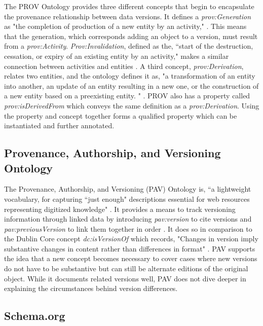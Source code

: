 The PROV Ontology provides three different concepts that begin to encapsulate the provenance relationship between data versions.
It defines a \textit{prov:Generation} as "the completion of production of a new entity by an activity," \cite{Lebo2013}.
This means that the generation, which corresponds adding an object to a version, must result from a \textit{prov:Activity}.
\textit{Prov:Invalidation}, defined as the, ``start of the destruction, cessation, or expiry of an existing entity by an activity," makes a similar connection between activities and entities \cite{Lebo2013}.
A third concept, \textit{prov:Derivation}, relates two entities, and the ontology defines it as, "a transformation of an entity into another, an update of an entity resulting in a new one, or the construction of a new entity based on a preexisting entity. " \cite{Lebo2013}.
PROV also has a property called \textit{prov:isDerivedFrom} which conveys the same definition as a \textit{prov:Derivation}.
Using the property and concept together forms a qualified property which can be instantiated and further annotated.

\subsection{Provenance, Authorship, and Versioning Ontology}

The Provenance, Authorship, and Versioning (PAV) Ontology is, ``a lightwei\-ght vocabulary, for capturing ``just enough" descriptions essential for web resources representing digitized knowledge" \cite{Ciccarese2013}.
It provides a means to track versioning information through linked data by introducing \textit{pav:version} to cite versions and \textit{pav:previousVersion} to link them together in order \cite{Ciccarese2013}.
It does so in comparison to the Dublin Core concept \textit{dc:isVersionOf} which records, "Changes in version imply substantive changes in content rather than differences in format" \cite{DCMI2012}.
PAV supports the idea that a new concept becomes necessary to cover cases where new versions do not have to be substantive but can still be alternate editions of the original object.
While it documents related versions well, PAV does not dive deeper in explaining the circumstances behind version differences.

\subsection{Schema.org}

